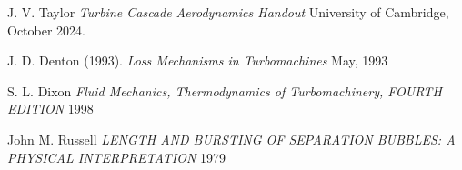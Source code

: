 \documentclass{article}
\begin{document}
\begin{thebibliography}{9}


  J. V. Taylor
  \emph{Turbine Cascade Aerodynamics Handout}
  University of Cambridge,
  October 2024.

  J. D. Denton (1993).
  \emph{Loss Mechanisms in Turbomachines}
  May, 1993 

  S. L. Dixon
  \emph{Fluid Mechanics, Thermodynamics of Turbomachinery, FOURTH EDITION}
  1998

  John M. Russell
  \emph{LENGTH AND BURSTING OF SEPARATION BUBBLES: A PHYSICAL INTERPRETATION}
  1979
\end{thebibliography}
\end{document}
